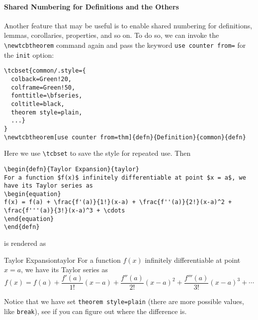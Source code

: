 \paragraph{Shared Numbering for Definitions and the Others}
Another feature that may be useful is to enable shared numbering for definitions, lemmas, corollaries, properties, and so on. To do so, we can invoke the \texttt{\textbackslash newtcbtheorem} command again and pass the keyword \texttt{use counter from=} for the \texttt{init} option:
\begin{lstlisting}
\tcbset{common/.style={
  colback=Green!20,
  colframe=Green!50,
  fonttitle=\bfseries,
  coltitle=black,
  theorem style=plain,
  ...}
}
\newtcbtheorem[use counter from=thm]{defn}{Definition}{common}{defn}
\end{lstlisting}
Here we use \texttt{\textbackslash tcbset} to save the style for repeated use. Then
\begin{lstlisting}
\begin{defn}{Taylor Expansion}{taylor}
For a function $f(x)$ infinitely differentiable at point $x = a$, we have its Taylor series as
\begin{equation}
f(x) = f(a) + \frac{f'(a)}{1!}(x-a) + \frac{f''(a)}{2!}(x-a)^2 + \frac{f'''(a)}{3!}(x-a)^3 + \cdots 
\end{equation}
\end{defn}
\end{lstlisting}
is rendered as
\begin{defn}{Taylor Expansion}{taylor}
For a function $f(x)$ infinitely differentiable at point $x = a$, we have its Taylor series as
\begin{equation}
f(x) = f(a) + \frac{f'(a)}{1!}(x-a) + \frac{f''(a)}{2!}(x-a)^2 + \frac{f'''(a)}{3!}(x-a)^3 + \cdots 
\end{equation}
\end{defn}
Notice that we have set \texttt{theorem style=plain} (there are more possible values, like \texttt{break}), see if you can figure out where the difference is.

